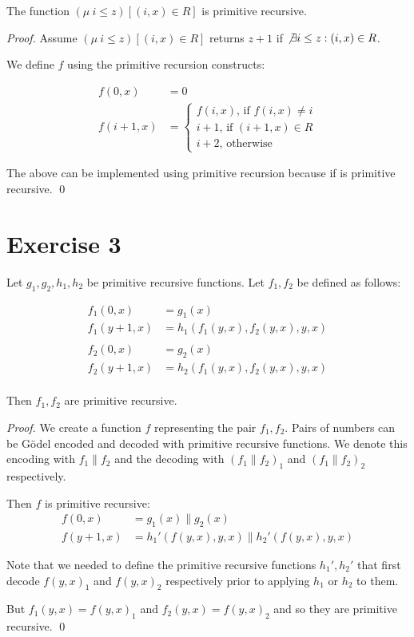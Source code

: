 \documentclass[11pt]{llncs}
\begin{document}
\begin{lemma}
The function $(\mu\>i \leq z)[(i, x) \in R]$ is primitive recursive.
\end{lemma}
\begin{proof}
Assume $(\mu\>i \leq z)[(i, x) \in R]$ returns $z + 1$ if
$\not\exists i \leq z: (i, x) \in R$.

We define $f$ using the primitive recursion constructs:

\begin{align*}
  f(0, x) &= 0\\
  f(i + 1, x) &= \begin{cases}
             f(i, x) \text{, if } f(i, x) \neq i\\
             i + 1 \text{, if } (i + 1, x) \in R\\
             i + 2 \text{, otherwise}
            \end{cases}
\end{align*}

The above can be implemented using primitive recursion because \textsf{if} is
primitive recursive.
\qed
\end{proof}

\section*{Exercise 3}
\begin{lemma}
Let $g_1, g_2, h_1, h_2$ be primitive recursive functions. Let $f_1, f_2$ be
defined as follows:

\begin{align*}
  f_1(0, x)     &= g_1(x)\\
  f_1(y + 1, x) &= h_1(f_1(y, x), f_2(y, x), y, x)\\
  \\
  f_2(0, x)     &= g_2(x)\\
  f_2(y + 1, x) &= h_2(f_1(y, x), f_2(y, x), y, x)\\
\end{align*}

Then $f_1, f_2$ are primitive recursive.
\end{lemma}
\begin{proof}
We create a function $f$ representing the pair $f_1, f_2$. Pairs of numbers can
be G\"odel encoded and decoded with primitive recursive functions. We denote
this encoding with $f_1\|f_2$ and the decoding with $(f_1\|f_2)_1$ and
$(f_1\|f_2)_2$ respectively.

Then $f$ is primitive recursive:
\begin{align*}
  f(0, x) &= g_1(x)\|g_2(x)\\
  f(y + 1, x) &= h_1'(f(y, x), y, x)\|h_2'(f(y, x), y, x)
\end{align*}

Note that we needed to define the primitive recursive functions $h_1', h_2'$
that first decode $f(y, x)_1$ and $f(y, x)_2$ respectively prior to applying
$h_1$ or $h_2$ to them.

But $f_1(y, x) = f(y, x)_1$ and $f_2(y, x) = f(y, x)_2$ and so they are
primitive recursive.
\qed
\end{proof}
\end{document}
